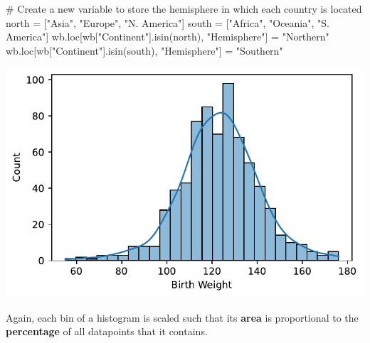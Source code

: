 \documentclass[
  letterpaper,
  DIV=11,
  numbers=noendperiod]{scrreprt}
\newenvironment{Shaded}{\begin{snugshade}}{\end{snugshade}}
\newcommand{\CommentTok}[1]{\textcolor[rgb]{0.37,0.37,0.37}{#1}}
\newcommand{\NormalTok}[1]{\textcolor[rgb]{0.00,0.23,0.31}{#1}}
\newcommand{\OperatorTok}[1]{\textcolor[rgb]{0.37,0.37,0.37}{#1}}
\newcommand{\StringTok}[1]{\textcolor[rgb]{0.13,0.47,0.30}{#1}}
\begin{document}
\begin{Shaded}
\begin{Highlighting}[]
\CommentTok{\# Create a new variable to store the hemisphere in which each country is located}
\NormalTok{north }\OperatorTok{=}\NormalTok{ [}\StringTok{"Asia"}\NormalTok{, }\StringTok{"Europe"}\NormalTok{, }\StringTok{"N. America"}\NormalTok{]}
\NormalTok{south }\OperatorTok{=}\NormalTok{ [}\StringTok{"Africa"}\NormalTok{, }\StringTok{"Oceania"}\NormalTok{, }\StringTok{"S. America"}\NormalTok{]}
\NormalTok{wb.loc[wb[}\StringTok{"Continent"}\NormalTok{].isin(north), }\StringTok{"Hemisphere"}\NormalTok{] }\OperatorTok{=} \StringTok{"Northern"}
\NormalTok{wb.loc[wb[}\StringTok{"Continent"}\NormalTok{].isin(south), }\StringTok{"Hemisphere"}\NormalTok{] }\OperatorTok{=} \StringTok{"Southern"}
\end{Highlighting}
\end{Shaded}

\begin{Shaded}
\end{Shaded}

\includegraphics{visualization_1/visualization_1_files/figure-pdf/cell-17-output-1.pdf}

Again, each bin of a histogram is scaled such that its \textbf{area} is
proportional to the \textbf{percentage} of all datapoints that it
contains.
\end{document}
